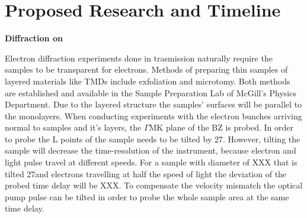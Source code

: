 \section{Proposed Research and Timeline}
\textbf{Diffraction on \ts}

Electron diffraction experiments done in trasmission naturally require the samples to be transparent for electrons.
Methods of preparing thin samples of layered materials like \acp{TMD} include exfoliation\cite{exf} and microtomy\cite{micro}.
Both methods are established and available in the Sample Preparation Lab of McGill's Physics Department.
Due to the layered structure the samples' surfaces will be parallel to the monolayers.
When conducting experiments with the electron bunches arriving normal to \ts\space samples and it's layers, the $\Gamma\mathrm{MK}$ plane of the \ac{BZ} is probed.
In order to probe the L points of \ts\space the sample needs to be tilted by 27\textdegree.
However, tilting the sample will decrease the time-resolution of the instrument, because electron and light pulse travel at different speeds.
For a sample with diameter of XXX that is tilted 27\textdegree and electrons travelling at half the speed of light the deviation of the probed time delay will be XXX.
To compensate the velocity mismatch the optical pump pulse can be tilted in order to probe the whole sample area at the same time delay\cite{baum2006}.